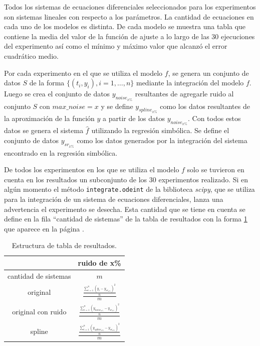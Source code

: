 Todos los sistemas de ecuaciones diferenciales seleccionados para los experimentos son sistemas lineales con respecto a los parámetros. La cantidad de ecuaciones en cada uno de los modelos es distinta. De cada modelo se muestra una tabla que contiene la media del valor de la función de ajuste a lo largo de las 30 ejecuciones del experimento así como el mínimo y máximo valor que alcanzó el error cuadrático medio.

Por cada experimento en el que se utiliza el modelo $f$, se genera un conjunto de datos $S$ de la forma $\{(t_i, y_i), i=1, \dots, n\}$ mediante la integración del modelo $f$. Luego se crea el conjunto de datos $y_{noise_{x\%}}$ resultantes de agregarle ruido al conjunto $S$ con $max\_noise=x$ y se define $y_{spline_{x\%}}$ como los datos resultantes de la aproximación de la función $y$ a partir de los datos $y_{noise_{x\%}}$. Con todos estos datos se genera el sistema $\hat{f}$ utilizando la regresión simbólica. Se define el conjunto de datos $y_{sr_{x\%}}$ como los datos generados por la integración del sistema encontrado en la regresión simbólica.


De todos los experimentos en los que se utiliza el modelo $f$ solo se tuvieron en cuenta en los resultados un subconjunto de los 30 experimentos realizado. Si en algún momento el método \texttt{integrate.odeint} de la biblioteca \emph{scipy}, que se utiliza para la integración de un sistema de ecuaciones diferenciales, lanza una advertencia el experimento se desecha. Esta cantidad que se tiene en cuenta se define en la fila ``cantidad de sistemas'' de la tabla de resultados con la forma \ref{table:experiment_form} que aparece en la página \pageref{table:experiment_form}.

\begin{table}
    \centering
    \caption{Estructura de tabla de resultados.}
    \begin{tabular}{|c|c|}
        \hline
                             & \textbf{ruido de x\%}                                                \\
        \hline
        cantidad de sistemas & $m$                                                                  \\
        \hline
        original             & $\frac{\frac{\sum_{i=1}^n (y_i-y_{sr_{x\%}})^2}{n}}{m}$              \\
        \hline
        original con ruido   & $\frac{\frac{\sum_{i=1}^n (y_{noise_{x\%}}-y_{sr_{x\%}})^2}{n}}{m}$  \\
        \hline
        spline               & $\frac{\frac{\sum_{i=1}^n (y_{spline_{x\%}}-y_{sr_{x\%}})^2}{n}}{m}$ \\
        \hline
    \end{tabular}
    \label{table:experiment_form}
\end{table}

